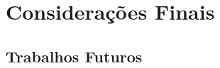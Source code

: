 \chapter{Considerações Finais} %
\label{cha:dificuldades_encontradas}
\section*{Trabalhos Futuros} %
\label{sec:trabalhos_futuros}


